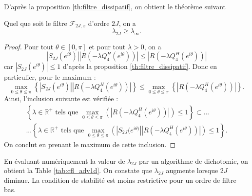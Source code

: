 D'après la proposition \ref{th:filtre_dissipatif}, on obtient le théorème suivant
\begin{theoreme}
Quel que soit le filtre $\mathcal{F}_{2J,x}$ d'ordre $2J$, on a 
\begin{equation}
\lambda_{2J} \geq \lambda_{\infty}.
\end{equation}
\end{theoreme}

\begin{proof}
Pour tout $\theta \in [0,\pi]$ et pour tout $\lambda >0$, on a 
\begin{equation}
|S_{2J}(e^{i \theta})||R(-\lambda Q_4^H(e^{i \theta}))| \leq  |R(-\lambda Q_4^H(e^{i \theta}))|
\end{equation}
car $|S_{2J}(e^{i \theta})| \leq 1$ d'après la proposition \ref{th:filtre_dissipatif}. Donc en particulier, pour le maximum :
\begin{equation}
\max_{0\leq \theta \leq \pi} \left\lbrace |S_{2J}(e^{i \theta})||R(-\lambda Q_4^H(e^{i \theta}))| \right\rbrace \leq  \max_{0\leq \theta \leq \pi} \left\lbrace|R(-\lambda Q_4^H(e^{i \theta}))|\right\rbrace.
\end{equation}
Ainsi, l'inclusion suivante est vérifiée :
\begin{multline}
\left\lbrace \lambda \in \mathbb{R}^+ \text{ tels que } \max_{0 \leq \theta \leq \pi} \left( |R(-\lambda Q_4^H (e^{i \theta}))| \right) \leq 1 \right\rbrace \subset ...\\
...
\left\lbrace \lambda \in \mathbb{R}^+ \text{ tels que } \max_{0 \leq \theta \leq \pi} \left( |S_{2J}(e^{i \theta)}||R(-\lambda Q_4^H (e^{i \theta}))| \right) \leq 1 \right\rbrace.
\end{multline}
On conclut en prenant le maximum de cette inclusion.
\end{proof}

En évaluant numériquement la valeur de $\lambda_{2J}$ par un algorithme de dichotomie, on obtient la Table \ref{tab:cfl_adv1d}. On constate que $\lambda_{2J}$ augmente lorsque $2J$ diminue. La condition de stabilité est moins restrictive pour un ordre de filtre bas.


